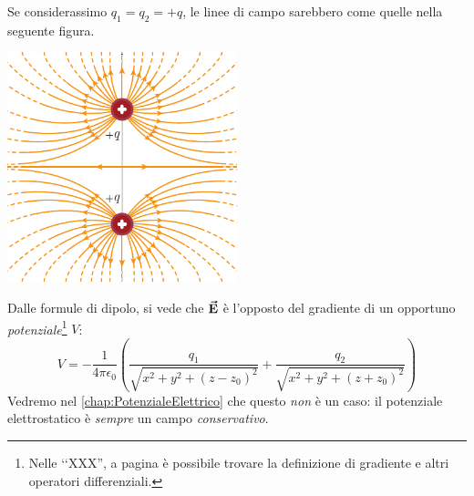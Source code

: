 Se considerassimo $q_1=q_2=+q$, le linee di campo sarebbero come quelle nella seguente figura.
\begin{center}
	\includegraphics[width=0.5\textwidth]{images/chp1campodipolo2.pdf}
\end{center}
\begin{observe}
	Dalle formule di dipolo, si vede che $\vb*{\va{E}}$ è l'opposto del gradiente di un opportuno \textit{potenziale}\footnote{Nelle ‘‘XXX'', a pagina \pageref{gradiente} è possibile trovare la definizione di gradiente e altri operatori differenziali.} $V$:
	\begin{equation}
		V=-\frac{1}{4\pi\epsilon_0}\left(\frac{q_1}{\sqrt{x^2+y^2+(z-z_0)^2}}+\frac{q_2}{\sqrt{x^2+y^2+(z+z_0)^2}}\right)
	\end{equation}
Vedremo nel \autoref{chap:PotenzialeElettrico} che questo \textit{non} è un caso: il potenziale elettrostatico è \textit{sempre} un campo \textit{conservativo}.
\end{observe}
